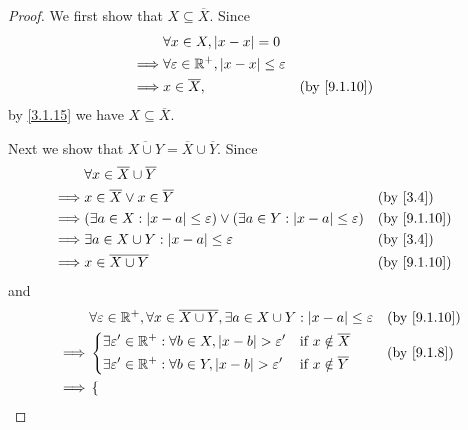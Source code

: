 \begin{proof}
  We first show that \(X \subseteq \overline{X}\).
  Since
  \begin{align*}
             & \forall x \in X, \abs{x - x} = 0                                            \\
    \implies & \forall \varepsilon \in \R^+, \abs{x - x} \leq \varepsilon                  \\
    \implies & x \in \overline{X},                                        &  & \by{9.1.10}
  \end{align*}
  by \cref{3.1.15} we have \(X \subseteq \overline{X}\).

  Next we show that \(\overline{X \cup Y} = \overline{X} \cup \overline{Y}\).
  Since
  \begin{align*}
             & \forall x \in \overline{X} \cup \overline{Y}                                                                                       \\
    \implies & x \in \overline{X} \lor x \in \overline{Y}                                                             &  & \text{(by \cref{3.4})} \\
    \implies & (\exists a \in X : \abs{x - a} \leq \varepsilon) \lor (\exists a \in Y : \abs{x - a} \leq \varepsilon) &  & \by{9.1.10}            \\
    \implies & \exists a \in X \cup Y : \abs{x - a} \leq \varepsilon                                                  &  & \text{(by \cref{3.4})} \\
    \implies & x \in \overline{X \cup Y}                                                                              &  & \by{9.1.10}
  \end{align*}
  and
  \begin{align*}
             & \forall \varepsilon \in \R^+, \forall x \in \overline{X \cup Y}, \exists a \in X \cup Y : \abs{x - a} \leq \varepsilon &  & \by{9.1.10}            \\
    \implies & \begin{dcases}
                 \exists \varepsilon' \in \R^+ : \forall b \in X, \abs{x - b} > \varepsilon' & \text{if } x \notin \overline{X} \\
                 \exists \varepsilon' \in \R^+ : \forall b \in Y, \abs{x - b} > \varepsilon' & \text{if } x \notin \overline{Y}
               \end{dcases}      &  & \by{9.1.8}                                     \\
    \implies & \begin{dcases}

\end{dcases}
\end{align*}
\end{proof}
